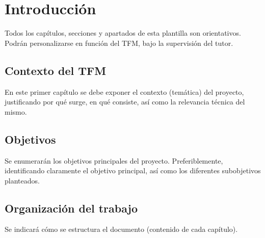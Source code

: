 \vspace*{-1cm}


\section{Introducción} %
\label{sec:introduccion}


Todos los capítulos, secciones y apartados de esta plantilla son orientativos. Podrán personalizarse en función del TFM, bajo la supervisión del tutor. 

\subsection{Contexto del TFM}
En este primer capítulo se debe exponer el contexto (temática) del proyecto, justificando por qué surge, en qué consiste, así como la relevancia técnica del mismo.

\subsection{Objetivos}
Se enumerarán los objetivos principales del proyecto. Preferiblemente, identificando claramente el objetivo principal, así como los diferentes subobjetivos planteados.

\subsection{Organización del trabajo}
Se indicará cómo se estructura el documento (contenido de cada capítulo).

